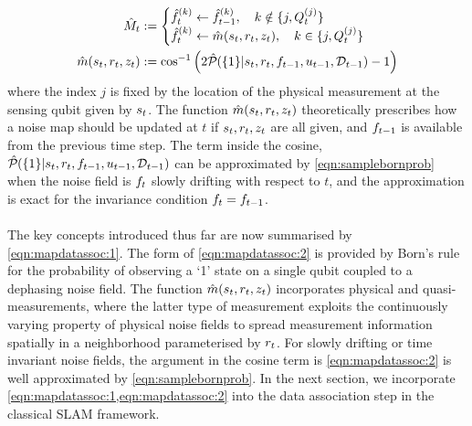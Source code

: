 \begin{align}
\hat{M}_t & := \begin{cases} \hat{f}^{( k )}_{t} \leftarrow \hat{f}^{( k )}_{t-1}, \quad k\notin \{j, Q^{( j )}_{t}\}  \\  \hat{f}^{( k )}_{t} \leftarrow  \hat{m}(s_{ t}, r_{ t}, z_t), \quad k\in \{j, Q^{( j )}_{t}\} \end{cases} \label{eqn:mapdatassoc:1}\\
\hat{m}(s_{ t}, r_{ t}, z_t) &:= \cos^{-1}\left( 2\hat{\mathcal{P}}_{} (\{1\} | s_{ t}, r_{ t}, f_{ t-1}, u_{t-1}, \mathcal{D}_{t-1}) - 1 \right) \label{eqn:mapdatassoc:2} 
\end{align} where the index $j$  is fixed by the location of the physical measurement at the sensing qubit  given by $s_{ t}$. The function  $\hat{m}(s_{ t}, r_{ t}, z_t)$ theoretically prescribes how a noise map should be updated at $t$ if $s_{ t}, r_{ t}, z_t$ are all given, and $f_{ t-1}$ is available from the previous time step. The term inside the cosine, $\hat{\mathcal{P}}_{} (\{1\} | s_{ t}, r_{ t}, f_{ t-1}, u_{t-1}, \mathcal{D}_{t-1})$ can be approximated by \cref{eqn:samplebornprob} when the noise field is $f_{ t}$ slowly drifting with respect to $t$, and the approximation is exact for the invariance condition $f_{ t} = f_{ t-1}$.\\
\\
The key concepts introduced thus far are now summarised by \cref{eqn:mapdatassoc:1}. The form of \cref{eqn:mapdatassoc:2} is provided by Born's rule for the probability of observing a `1' state on a single qubit coupled to a dephasing noise field. The function $\hat{m}(s_{ t}, r_{ t}, z_t)$ incorporates physical and quasi-measurements, where the latter type of measurement exploits the continuously varying property of physical noise fields to spread measurement information spatially in a neighborhood parameterised by $r_{ t}$. For slowly drifting or time invariant noise fields, the argument in the cosine term is \cref{eqn:mapdatassoc:2} is well approximated by \cref{eqn:samplebornprob}. In the next section, we incorporate  \cref{eqn:mapdatassoc:1,eqn:mapdatassoc:2} into the data association step in the classical SLAM framework.


